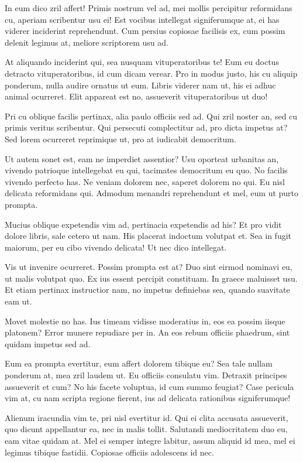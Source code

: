 \documentclass[
	12pt,				%
	openright,			%
	oneside,			%
	a4paper,			%
	english,			%
	french,				%
	spanish,			%
	brazil,				%
	]{abntex2}
\begin{document}
In eum dico zril affert! Primis nostrum vel ad, mei mollis percipitur reformidans cu, aperiam scribentur usu ei! Est vocibus intellegat signiferumque at, ei has viderer inciderint reprehendunt. Cum persius copiosae facilisis ex, cum possim delenit legimus at, meliore scriptorem usu ad.

At aliquando inciderint qui, sea nusquam vituperatoribus te! Eum eu doctus detracto vituperatoribus, id cum dicam verear. Pro in modus justo, his cu aliquip ponderum, nulla audire ornatus ut eum. Libris viderer nam ut, his ei adhuc animal ocurreret. Elit appareat est no, assueverit vituperatoribus ut duo!

Pri cu oblique facilis pertinax, alia paulo officiis sed ad. Qui zril noster an, sed cu primis veritus scribentur. Qui persecuti complectitur ad, pro dicta impetus at? Sed lorem ocurreret reprimique ut, pro at iudicabit democritum.

Ut autem sonet est, eam ne imperdiet assentior? Usu oporteat urbanitas an, vivendo patrioque intellegebat eu qui, tacimates democritum eu quo. No facilis vivendo perfecto has. Ne veniam dolorem nec, saperet dolorem no qui. Eu nisl delicata reformidans qui. Admodum menandri reprehendunt et mel, eum ut purto prompta.

Mucius oblique expetendis vim ad, pertinacia expetendis ad his? Et pro vidit dolore libris, sale cetero ut nam. His placerat indoctum volutpat et. Sea in fugit maiorum, per eu cibo vivendo delicata! Ut nec dico intellegat.

Vis ut invenire ocurreret. Possim prompta est at? Duo sint eirmod nominavi eu, ut malis volutpat quo. Ex ius essent percipit constituam. In graece maluisset usu. Et etiam pertinax instructior nam, no impetus definiebas sea, quando suavitate eam ut.

Movet molestie no has. Ius timeam vidisse moderatius in, eos ea possim iisque platonem? Error munere repudiare per in. An eos rebum officiis phaedrum, sint quidam impetus sed ad.

Eum ea prompta evertitur, eum affert dolorem tibique eu? Sea tale nullam ponderum at, mea zril laudem ut. Eu officiis consulatu vim. Detraxit principes assueverit et cum? No his facete voluptua, id cum summo feugiat? Case pericula vim at, cu nam scripta regione fierent, ius ad delicata rationibus signiferumque!

Alienum iracundia vim te, pri nisl evertitur id. Qui ei clita accusata assueverit, quo dicunt appellantur ea, nec in malis tollit. Salutandi mediocritatem duo eu, eam vitae quidam at. Mel ei semper integre labitur, assum aliquid id mea, mel ei legimus tibique fastidii. Copiosae officiis adolescens id nec.
\end{document}
